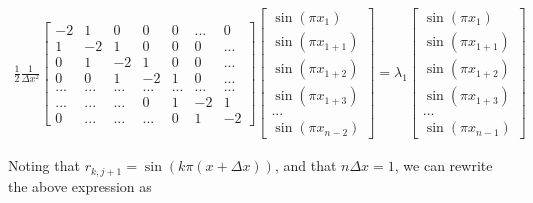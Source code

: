 \documentclass{article}
\begin{document}
	\begin{align*}
	 \frac{1}{2}\frac{1}{\Delta x^{2}}\begin{bmatrix}
	-2 & 1 & 0 & 0 & 0 & ... & 0\\
	1 & -2 & 1 & 0 & 0 & 0 & ...\\
	0 & 1 & -2 & 1 & 0 & 0 & ... \\
	0 & 0 & 1 & -2 & 1 & 0 & ... \\
	... & ... & ... & ... & ... & ... & ... \\
	... & ... & ... & 0 & 1 & -2 & 1 \\
	0 & ... & ... & ... & 0 & 1 & -2 
	\end{bmatrix}
	\begin{bmatrix}
	\sin(\pi x_{1}) \\
	\sin(\pi x_{1+1})\\
	\sin(\pi x_{1+2})\\
	\sin(\pi x_{1+3})\\
	...\\
	\sin(\pi x_{n-2})
	\end{bmatrix}=\lambda_{1}
	\begin{bmatrix}
	\sin(\pi x_{1}) \\
	\sin(\pi x_{1+1})\\
	\sin(\pi x_{1+2})\\
	\sin(\pi x_{1+3})\\
	...\\
	\sin(\pi x_{n-1})
	\end{bmatrix}
	\end{align*}
	
	Noting that $r_{k,j+1}=\sin(k\pi(x+\Delta x))$, and that $n\Delta x=1$, we can rewrite the above expression as 
	
\end{document}
